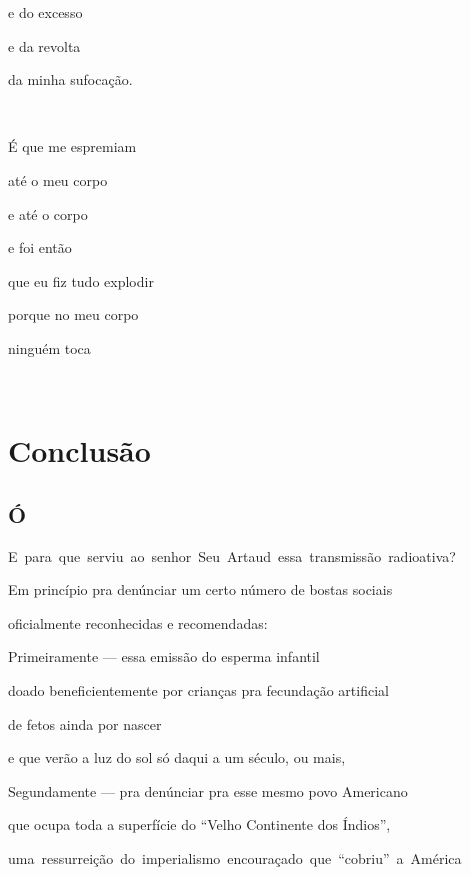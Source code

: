 e do excesso

e da revolta

da minha sufocação.

~

É que me espremiam

até o meu corpo

e até o corpo

e foi então

que eu fiz tudo explodir

porque no meu corpo

ninguém toca

~


\chapter{Conclusão}


\section*{Ó}


\mbox{E para que serviu ao senhor Seu Artaud essa transmissão radioativa?}



Em princípio pra denúnciar um certo número de bostas sociais

oficialmente reconhecidas e recomendadas:


Primeiramente --- essa emissão do esperma infantil

doado beneficientemente por crianças pra fecundação artificial

de fetos ainda por nascer

e que verão a luz do sol só daqui a um século, ou mais,

Segundamente --- pra denúnciar pra esse mesmo povo Americano

que ocupa toda a superfície do ``Velho Continente dos Índios'',

\mbox{uma ressurreição do imperialismo encouraçado que ``cobriu'' a América}

